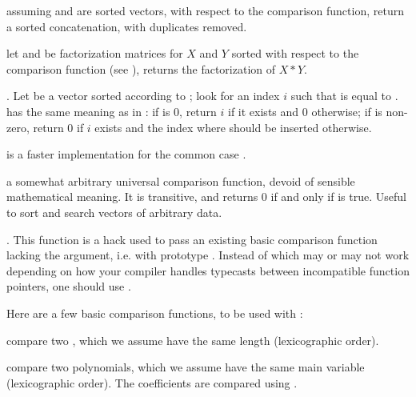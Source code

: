 assuming  and  are sorted vectors, with respect to the 
comparison function, return a sorted concatenation, with duplicates removed.

let  and  be factorization matrices for $X$ and $Y$
sorted with respect to the comparison function  (see
), returns the factorization of $X * Y$.

.\hfil\break
Let  be a vector sorted according to ; look for an
index $i$ such that   is equal to .  has the
same meaning as in : if  is 0, return $i$ if it
exists and 0 otherwise; if  is non-zero, return $0$ if $i$ exists
and the index where  should be inserted otherwise.

 is a faster
implementation for the common case .


 a somewhat arbitrary universal
comparison function, devoid of sensible mathematical meaning. It is
transitive, and returns 0 if and only if  is true.
Useful to sort and search vectors of arbitrary data.

. This function is a hack
used to pass an existing basic comparison function lacking the 
argument, i.e. with prototype . Instead of
 which may or may not work depending on how your
compiler handles typecasts between incompatible function pointers, one should
use .

Here are a few basic comparison functions, to be used with :

 compare two , which we assume have
the same length (lexicographic order).

 compare two polynomials, which we assume
have the same main variable (lexicographic order). The coefficients are
compared using .

